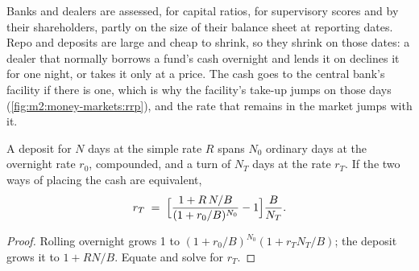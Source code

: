 Banks and dealers are assessed, for capital ratios, for supervisory scores
and by their shareholders, partly on the size of their balance sheet at
reporting dates. Repo and deposits are large and cheap to shrink, so they
shrink on those dates: a dealer that normally borrows a fund's cash overnight
and lends it on declines it for one night, or takes it only at a price. The
cash goes to the central bank's facility if there is one, which is why the
facility's take-up jumps on those days (\cref{fig:m2:money-markets:rrp}), and
the rate that remains in the market jumps with it.

\begin{omfigure}

\label{fig:m2:money-markets:rrp}
\end{omfigure}

\begin{proposition}\label{prop:m2:money-markets:turn}
A deposit for $N$ days at the simple rate $R$ spans $N_0$ ordinary days at
the overnight rate $r_0$, compounded, and a turn of $N_T$ days at the rate
$r_T$. If the two ways of placing the cash are equivalent,
\[
r_T \;=\; \Bigl[\frac{1 + R\,N/B}{(1 + r_0/B)^{N_0}} - 1\Bigr]\frac{B}{N_T} .
\]
\end{proposition}
\begin{proof}
Rolling overnight grows 1 to $(1 + r_0/B)^{N_0}(1 + r_T N_T/B)$; the deposit
grows it to $1 + RN/B$. Equate and solve for $r_T$.
\end{proof}

